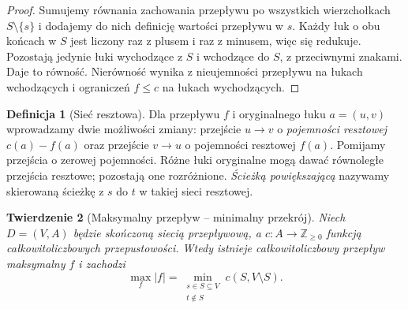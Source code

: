 \documentclass[11pt,a4paper]{report}
\numberwithin{equation}{section}
\theoremstyle{plain}
\newtheorem{twierdzenie}{Twierdzenie}[section]
\theoremstyle{definition}
\newtheorem{definicja}[twierdzenie]{Definicja}
\theoremstyle{remark}
\begin{document}
\begin{proof}
Sumujemy równania zachowania przepływu po wszystkich
wierzchołkach $S\setminus\{s\}$ i dodajemy do nich
definicję wartości przepływu w $s$. Każdy łuk o obu końcach
w $S$ jest liczony raz z plusem i raz z minusem, więc się
redukuje. Pozostają jedynie łuki wychodzące z $S$
i wchodzące do $S$, z przeciwnymi znakami. Daje to równość.
Nierówność wynika z nieujemności przepływu na łukach
wchodzących i ograniczeń $f\le c$ na łukach wychodzących.
\end{proof}

\begin{definicja}[Sieć resztowa]
Dla przepływu $f$ i oryginalnego łuku $a=(u,v)$
wprowadzamy dwie możliwości zmiany: przejście $u\to v$
o \emph{pojemności resztowej} $c(a)-f(a)$ oraz przejście
$v\to u$ o pojemności resztowej $f(a)$. Pomijamy
przejścia o zerowej pojemności. Różne łuki oryginalne
mogą dawać równoległe przejścia resztowe; pozostają one
rozróżnione. \emph{Ścieżką powiększającą} nazywamy
skierowaną ścieżkę z $s$ do $t$ w takiej sieci resztowej.
\end{definicja}

\begin{twierdzenie}[Maksymalny przepływ -- minimalny przekrój]
\label{thm:tg-maxflow}
Niech $D=(V,A)$ będzie skończoną siecią przepływową,
a $c:A\to\mathbb Z_{\ge0}$ funkcją całkowitoliczbowych
przepustowości. Wtedy istnieje całkowitoliczbowy przepływ
maksymalny $f$ i zachodzi
\[
\max_f |f|=\min_{\substack{s\in S\subseteq V\\t\notin S}}
 c(S,V\setminus S).
\]
\end{twierdzenie}
\end{document}
